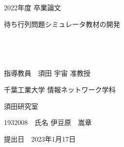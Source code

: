 \documentclass[12pt,a4j]{ltjsarticle}
\begin{document}
\begin{titlepage}
  \begin{center}
  
    \vspace*{20truept}
    
    {\LARGE 2022年度 卒業論文} 
    
    \vspace*{75truept}
    
    {\Huge 待ち行列問題シミュレータ教材の開発}　%

    \vspace{10truept}

    {\Huge }　%

    \vspace{10truept}

    {\Huge }　%

    \vspace{85truept}
    
    {\LARGE 指導教員　須田 宇宙 准教授}
    
    \vspace{60truept}
    
    {\LARGE 千葉工業大学 情報ネットワーク学科}
    
    \vspace{15truept}
    
    {\LARGE 須田研究室}
    
    \vspace{70truept}
    
    {\LARGE 1932008　氏名 伊豆原　嵩章 }　%

    \vspace{70truept}
    
  \end{center}
  \begin{flushright}

    {\LARGE 提出日　2023年1月17日}
  
  \end{flushright}
\end{titlepage}

\tableofcontents
\clearpage

\pagestyle{plain}
\setcounter{page}{1}
\end{document}
